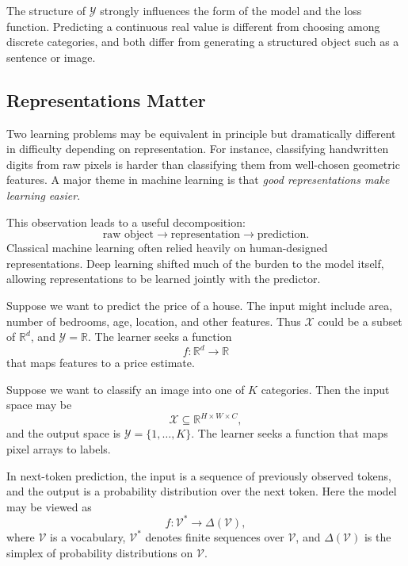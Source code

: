 The structure of $\mathcal{Y}$ strongly influences the form of the model and the loss function. Predicting a continuous real value is different from choosing among discrete categories, and both differ from generating a structured object such as a sentence or image.

\subsection{Representations Matter}

Two learning problems may be equivalent in principle but dramatically different in difficulty depending on representation. For instance, classifying handwritten digits from raw pixels is harder than classifying them from well-chosen geometric features. A major theme in machine learning is that \emph{good representations make learning easier}.

This observation leads to a useful decomposition:
\[
\text{raw object} \longrightarrow \text{representation} \longrightarrow \text{prediction}.
\]
Classical machine learning often relied heavily on human-designed representations. Deep learning shifted much of the burden to the model itself, allowing representations to be learned jointly with the predictor.

\begin{example}
Suppose we want to predict the price of a house. The input might include area, number of bedrooms, age, location, and other features. Thus $\mathcal{X}$ could be a subset of $\mathbb{R}^d$, and $\mathcal{Y}=\mathbb{R}$. The learner seeks a function
\[
f : \mathbb{R}^d \to \mathbb{R}
\]
that maps features to a price estimate.
\end{example}

\begin{example}
Suppose we want to classify an image into one of $K$ categories. Then the input space may be
\[
\mathcal{X} \subseteq \mathbb{R}^{H \times W \times C},
\]
and the output space is $\mathcal{Y} = \{1,\dots,K\}$. The learner seeks a function that maps pixel arrays to labels.
\end{example}

\begin{example}
In next-token prediction, the input is a sequence of previously observed tokens, and the output is a probability distribution over the next token. Here the model may be viewed as
\[
f : \mathcal{V}^\ast \to \Delta(\mathcal{V}),
\]
where $\mathcal{V}$ is a vocabulary, $\mathcal{V}^\ast$ denotes finite sequences over $\mathcal{V}$, and $\Delta(\mathcal{V})$ is the simplex of probability distributions on $\mathcal{V}$.
\end{example}

